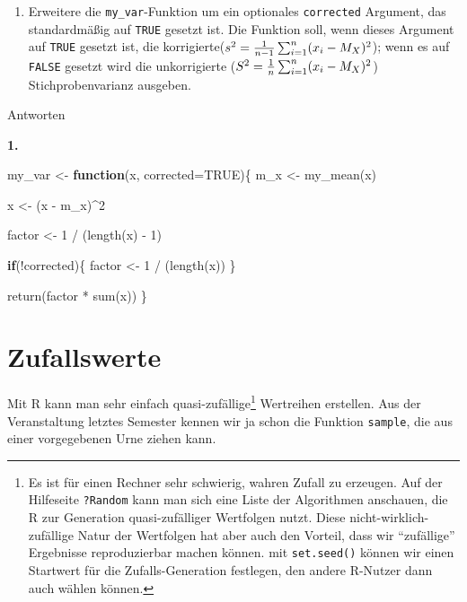 \documentclass[
]{book}
\newenvironment{Shaded}{\begin{snugshade}}{\end{snugshade}}
\newcommand{\AttributeTok}[1]{\textcolor[rgb]{0.77,0.63,0.00}{#1}}
\newcommand{\ConstantTok}[1]{\textcolor[rgb]{0.00,0.00,0.00}{#1}}
\newcommand{\ControlFlowTok}[1]{\textcolor[rgb]{0.13,0.29,0.53}{\textbf{#1}}}
\newcommand{\DecValTok}[1]{\textcolor[rgb]{0.00,0.00,0.81}{#1}}
\newcommand{\FunctionTok}[1]{\textcolor[rgb]{0.00,0.00,0.00}{#1}}
\newcommand{\NormalTok}[1]{#1}
\newcommand{\OtherTok}[1]{\textcolor[rgb]{0.56,0.35,0.01}{#1}}
\newcommand{\SpecialCharTok}[1]{\textcolor[rgb]{0.00,0.00,0.00}{#1}}
\providecommand{\tightlist}{%
  \setlength{\itemsep}{0pt}\setlength{\parskip}{0pt}}
\begin{document}
\begin{enumerate}
\def\labelenumi{\arabic{enumi}.}
\tightlist
\item
  Erweitere die \texttt{my\_var}-Funktion um ein optionales \texttt{corrected} Argument, das standardmäßig auf \texttt{TRUE} gesetzt ist. Die Funktion soll, wenn dieses Argument auf \texttt{TRUE} gesetzt ist, die korrigierte(\(s^2 = {1\over{n-1}} \sum_{i=1}^n(x_i -M_X)^2\)); wenn es auf \texttt{FALSE} gesetzt wird die unkorrigierte (\(S^2 = {1\over{n}} \sum_{i=1}^n(x_i -M_X)^2\)) Stichprobenvarianz ausgeben.
\end{enumerate}

Antworten

\textbf{1.}

\begin{Shaded}
\begin{Highlighting}[]
\NormalTok{my\_var }\OtherTok{\textless{}{-}} \ControlFlowTok{function}\NormalTok{(x, }\AttributeTok{corrected=}\ConstantTok{TRUE}\NormalTok{)\{}
\NormalTok{  m\_x }\OtherTok{\textless{}{-}} \FunctionTok{my\_mean}\NormalTok{(x)}
  
\NormalTok{  x }\OtherTok{\textless{}{-}}\NormalTok{ (x }\SpecialCharTok{{-}}\NormalTok{ m\_x)}\SpecialCharTok{\^{}}\DecValTok{2}
  
\NormalTok{  factor }\OtherTok{\textless{}{-}} \DecValTok{1} \SpecialCharTok{/}\NormalTok{ (}\FunctionTok{length}\NormalTok{(x) }\SpecialCharTok{{-}} \DecValTok{1}\NormalTok{)}
  
  \ControlFlowTok{if}\NormalTok{(}\SpecialCharTok{!}\NormalTok{corrected)\{}
\NormalTok{    factor }\OtherTok{\textless{}{-}} \DecValTok{1} \SpecialCharTok{/}\NormalTok{ (}\FunctionTok{length}\NormalTok{(x))}
\NormalTok{  \}}
  
  \FunctionTok{return}\NormalTok{(factor }\SpecialCharTok{*} \FunctionTok{sum}\NormalTok{(x))}
\NormalTok{\}}
\end{Highlighting}
\end{Shaded}

\hypertarget{zufallswerte}{%
\chapter{Zufallswerte}\label{zufallswerte}}

Mit R kann man sehr einfach quasi-zufällige\footnote{Es ist für einen Rechner sehr schwierig, wahren Zufall zu erzeugen. Auf der Hilfeseite \texttt{?Random} kann man sich eine Liste der Algorithmen anschauen, die R zur Generation quasi-zufälliger Wertfolgen nutzt. Diese nicht-wirklich-zufällige Natur der Wertfolgen hat aber auch den Vorteil, dass wir ``zufällige'' Ergebnisse reproduzierbar machen können. mit \texttt{set.seed()} können wir einen Startwert für die Zufalls-Generation festlegen, den andere R-Nutzer dann auch wählen können.} Wertreihen erstellen. Aus der Veranstaltung letztes Semester kennen wir ja schon die Funktion \texttt{sample}, die aus einer vorgegebenen Urne ziehen kann.
\end{document}
